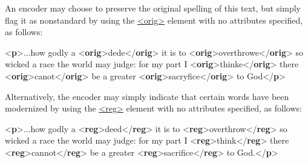An encoder may choose to preserve the original spelling of this text, but simply flag it as nonstandard by using the \hyperref[TEI.orig]{<orig>} element with no attributes specified, as follows: \par\bgroup{}\exampleFont \begin{shaded}\noindent\mbox{}{<\textbf{p}>}...how godly a {<\textbf{orig}>}dede{</\textbf{orig}>} it is to\mbox{}\newline 
{<\textbf{orig}>}overthrowe{</\textbf{orig}>} so wicked a race the\mbox{}\newline 
 world may judge: for my part I {<\textbf{orig}>}thinke{</\textbf{orig}>}\mbox{}\newline 
 there {<\textbf{orig}>}canot{</\textbf{orig}>} be a greater\mbox{}\newline 
{<\textbf{orig}>}sacryfice{</\textbf{orig}>} to God{</\textbf{p}>}\end{shaded}\egroup\par \par
Alternatively, the encoder may simply indicate that certain words have been modernized by using the \hyperref[TEI.reg]{<reg>} element with no attributes specified, as follows:\par\bgroup{}\exampleFont \begin{shaded}\noindent\mbox{}{<\textbf{p}>}...how godly a\mbox{}\newline 
{<\textbf{reg}>}deed{</\textbf{reg}>} it is to {<\textbf{reg}>}overthrow{</\textbf{reg}>} so wicked a race the\mbox{}\newline 
 world may judge: for my part I {<\textbf{reg}>}think{</\textbf{reg}>}\mbox{}\newline 
 there {<\textbf{reg}>}cannot{</\textbf{reg}>} be a greater\mbox{}\newline 
{<\textbf{reg}>}sacrifice{</\textbf{reg}>} to God.{</\textbf{p}>}\end{shaded}\egroup\par \par

